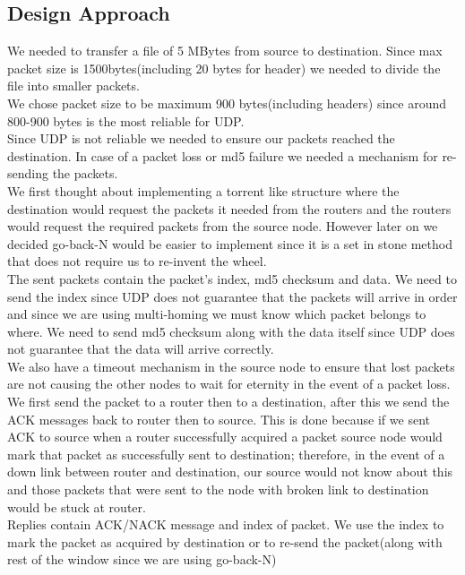\documentclass[conference]{IEEEtran}
\begin{document}
\subsection{Design Approach}
We needed to transfer a file of 5 MBytes from source to destination. Since max packet size is 1500bytes(including 20 bytes for header) we needed to divide the file into smaller packets. \\
We chose packet size to be maximum 900 bytes(including headers) since around 800-900 bytes is the most reliable for UDP. \\
Since UDP is not reliable we needed to ensure our packets reached the destination. In case of a packet loss or md5 failure we needed a mechanism for re-sending the packets. \\
We first thought about implementing a torrent like structure where the destination would request the packets it needed from the routers and the routers would request the required packets from the source node. However later on we decided go-back-N would be easier to implement since it is a set in stone method that does not require us to re-invent the wheel. \\
The sent packets contain the packet's index, md5 checksum and data. We need to send the index since UDP does not guarantee that the packets will arrive in order and since we are using multi-homing we must know which packet belongs to where. We need to send md5 checksum along with the data itself since UDP does not guarantee that the data will arrive correctly.\\
We also have a timeout mechanism in the source node to ensure that lost packets are not causing the other nodes to wait for eternity in the event of a packet loss.\\
We first send the packet to a router then to a destination, after this we send the ACK messages back to router then to source. This is done because if we sent ACK to source when a router successfully acquired a packet source node would mark that packet as successfully sent to destination; therefore, in the event of a down link between router and destination, our source would not know about this and those packets that were sent to the node with broken link to destination would be stuck at router. \\
Replies contain ACK/NACK message and index of packet. We use the index to mark the packet as acquired by destination or to re-send the packet(along with rest of the window since we are using go-back-N) \\
\end{document}
